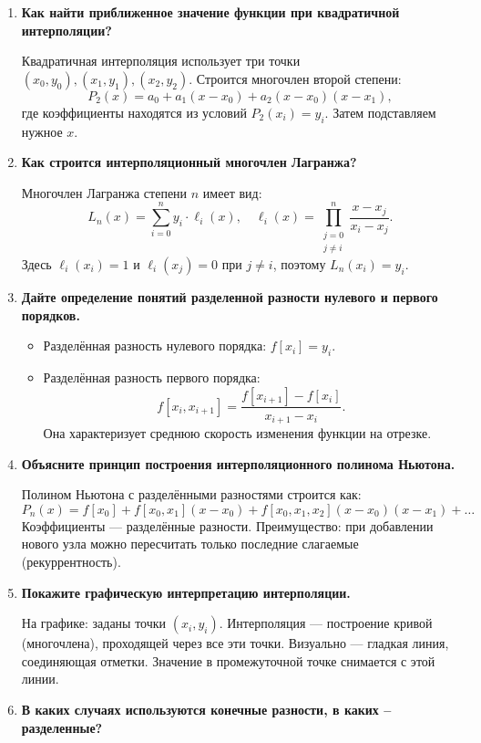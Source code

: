 \documentclass[a4paper,12pt]{article}
\begin{document}
\begin{enumerate}
\item \textbf{Как найти приближенное значение функции при квадратичной интерполяции?}

	Квадратичная интерполяция использует три точки \( (x_0, y_0), (x_1, y_1), (x_2, y_2) \). Строится многочлен второй степени:
	\[
	P_2(x) = a_0 + a_1 (x - x_0) + a_2 (x - x_0)(x - x_1),
	\]
	где коэффициенты находятся из условий \( P_2(x_i) = y_i \). Затем подставляем нужное \( x \).

\item \textbf{Как строится интерполяционный многочлен Лагранжа?}

	Многочлен Лагранжа степени \( n \) имеет вид:
	\[
	L_n(x) = \sum_{i=0}^{n} y_i \cdot \ell_i(x), \quad
	\ell_i(x) = \prod_{\substack{j=0 \\ j \neq i}}^{n} \frac{x - x_j}{x_i - x_j}.
	\]
	Здесь \( \ell_i(x_i) = 1 \) и \( \ell_i(x_j) = 0 \) при \( j \neq i \), поэтому \( L_n(x_i) = y_i \).

\item \textbf{Дайте определение понятий разделенной разности нулевого и первого порядков.}

	\begin{itemize}
		\item Разделённая разность нулевого порядка: \( f[x_i] = y_i \).
		\item Разделённая разность первого порядка:
		\[
		f[x_i, x_{i+1}] = \frac{f[x_{i+1}] - f[x_i]}{x_{i+1} - x_i}.
		\]
		Она характеризует среднюю скорость изменения функции на отрезке.
	\end{itemize}

\item \textbf{Объясните принцип построения интерполяционного полинома Ньютона.}

	Полином Ньютона с разделёнными разностями строится как:
	\[
	P_n(x) = f[x_0] + f[x_0,x_1](x-x_0) + f[x_0,x_1,x_2](x-x_0)(x-x_1) + \dots
	\]
	Коэффициенты — разделённые разности. Преимущество: при добавлении нового узла можно пересчитать только последние слагаемые (рекуррентность).

\item \textbf{Покажите графическую интерпретацию интерполяции.}

	На графике: заданы точки \( (x_i, y_i) \). Интерполяция — построение кривой (многочлена), проходящей через все эти точки. Визуально — гладкая линия, соединяющая отметки. Значение в промежуточной точке снимается с этой линии.

\item \textbf{В каких случаях используются конечные разности, в каких – разделенные?}


\end{enumerate}
\end{document}
